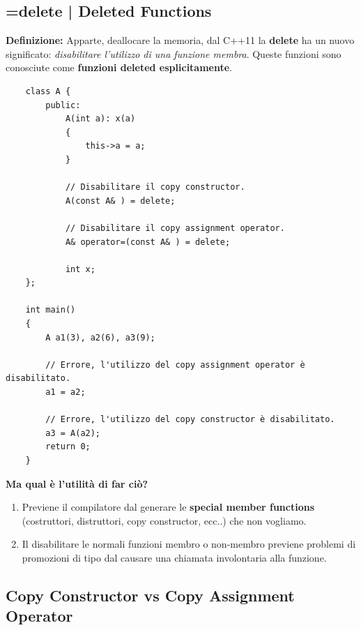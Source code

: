 \subsection{=delete | Deleted Functions}

\textsf{\small \textbf{Definizione: } Apparte, deallocare la memoria, dal C++11 la \textbf{delete} ha un nuovo significato: \emph{disabilitare l'utilizzo di una funzione membra}. Queste funzioni sono conosciute come \textbf{funzioni deleted esplicitamente}.} \\

\begin{lstlisting}
	class A {
		public:
			A(int a): x(a)
			{
				this->a = a;
			}
		
			// Disabilitare il copy constructor.
			A(const A& ) = delete;
			
			// Disabilitare il copy assignment operator.
			A& operator=(const A& ) = delete;
			
			int x;
	};

	int main()
	{
		A a1(3), a2(6), a3(9);
		
		// Errore, l'utilizzo del copy assignment operator è disabilitato.
		a1 = a2;
		
		// Errore, l'utilizzo del copy constructor è disabilitato.
		a3 = A(a2);
		return 0;
	}
\end{lstlisting}

\textsf{\small \textbf{Ma qual è l'utilità di far ciò?}} \\

\begin{enumerate}
	\item \textsf{\small Previene il compilatore dal generare le \textbf{special member functions} (costruttori, distruttori, copy constructor, ecc..) che non vogliamo.} \\
	\item \textsf{\small Il disabilitare le normali funzioni membro o non-membro previene problemi di promozioni di tipo dal causare una chiamata involontaria alla funzione.} \\
\end{enumerate}

\subsection{Copy Constructor vs Copy Assignment Operator}

